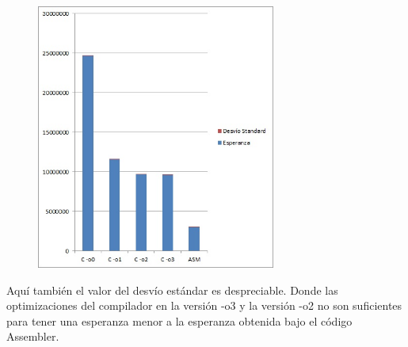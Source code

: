 \begin{figure}[h!]
  \begin{center}
	\includegraphics[width=0.7\textwidth]{imagenes/41.jpg}
  \end{center}
\end{figure}
Aqu\'i tambi\'en el valor del desv\'io est\'andar es despreciable. Donde las optimizaciones del compilador en la versi\'on -o3 y la versi\'on -o2 no son suficientes para tener una esperanza menor a la esperanza obtenida bajo el c\'odigo Assembler.\\

\newpage